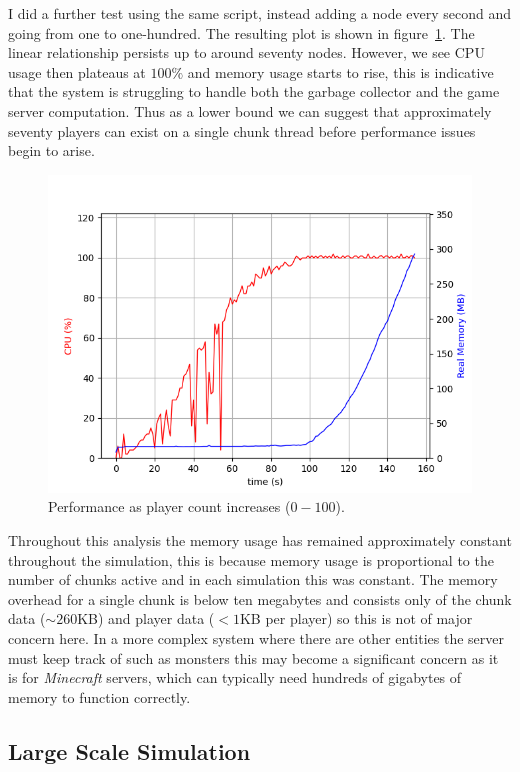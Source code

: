 \documentclass[12pt,notitlepage,a4paper]{report}
\begin{document}
	I did a further test using the same script, instead adding a node every second and going from one to one-hundred. The resulting plot is shown in figure~\ref{fig:linear100}. The linear relationship persists up to around seventy nodes. However, we see CPU usage then plateaus at $100\%$ and memory usage starts to rise, this is indicative that the system is struggling to handle both the garbage collector and the game server computation. Thus as a lower bound we can suggest that approximately seventy players can exist on a single chunk thread before performance issues begin to arise.
	\begin{figure}[!ht]
		\includegraphics[width=\textwidth]{linear100.png}
		\caption{Performance as player count increases ($0-100$).}
		\label{fig:linear100}
	\end{figure}

	Throughout this analysis the memory usage has remained approximately constant throughout the simulation, this is because memory usage is proportional to the number of chunks active and in each simulation this was constant. The memory overhead for a single chunk is below ten megabytes and consists only of the chunk data ($\sim260$KB) and player data ($<1$KB per player) so this is not of major concern here. In a more complex system where there are other entities the server must keep track of such as monsters this may become a significant concern as it is for \emph{Minecraft} servers, which can typically need hundreds of gigabytes of memory to function correctly.
	
	\subsection{Large Scale Simulation}
\end{document}

